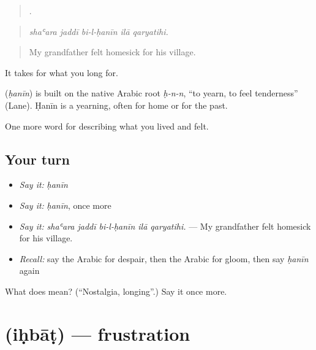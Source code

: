 \begin{quote}
    .
\end{quote}

\begin{quote}
\emph{shaʿara jaddī bi-l-ḥanīn ilā qaryatihi.}
\end{quote}

\begin{quote}
My grandfather felt homesick for his village.
\end{quote}

It takes  for what you long for.

\begin{cousinweb}
\textbf{} (\emph{ḥanīn}) is built on the native Arabic root \emph{ḥ-n-n}, \textquotedblleft{}to yearn, to feel tenderness\textquotedblright{} (Lane). Ḥanīn is a yearning, often for home or for the past.
\end{cousinweb}

\begin{grammarlens}[title={What you've built}]
One more word for describing what you lived and felt.
\end{grammarlens}

\subsection*{Your turn}
\begin{itemize}
\raggedright
  \item \emph{Say it:} \emph{ḥanīn}
  \item \emph{Say it:} \emph{ḥanīn}, once more
  \item \emph{Say it:} \emph{shaʿara jaddī bi-l-ḥanīn ilā qaryatihi.} — My grandfather felt homesick for his village.
  \item \emph{Recall:} say the Arabic for despair, then the Arabic for gloom, then say \emph{ḥanīn} again
\end{itemize}

\begin{tcolorbox}[breakable,colback=teal!4,colframe=teal!35!black,title={Before you move on}]
What does  mean? (\textquotedblleft{}Nostalgia, longing\textquotedblright{}.) Say it once more.
\end{tcolorbox}
\section[\texorpdfstring{\ar{إحباط} (iḥbāṭ)}{إحباط (iḥbāṭ)}]{ (iḥbāṭ) — frustration}

